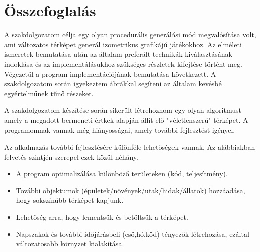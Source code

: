 \chapter*{Összefoglalás}

A szakdolgozatom célja egy olyan procedurális generálási mód megvalósítása volt, ami változatos térképet generál izometrikus grafikájú játékokhoz. Az elméleti ismeretek bemutatása után az általam preferált technikák kiválasztásának indoklása és az implementálásukhoz szükséges részletek kifejtése történt meg. Végezetül a program implementációjának bemutatása következett. A szakdolgozatom során igyekeztem ábrákkal segíteni az általam kevésbé egyértelműnek tűnő részeket. 

\bigskip

\noindent A szakdolgozatom készítése során sikerült létrehoznom egy olyan algoritmust amely a megadott bermeneti értkek alapján állít elő "véletlenszerű" térképet. A programomnak vannak még hiányosságai, amely további fejlesztést igényel.

\bigskip

\noindent Az alkalmazás további fejlesztésére különféle lehetőségek vannak. Az alábbiakban felvetés szintjén szerepel ezek közül néhány.
\begin{itemize}
\item A program optimalizálása különböző területeken (kód, teljesítmény).
\item További objektumok (épületek/növények/utak/hidak/állatok) hozzáadása, hogy sokszínűbb térképet kapjunk.
\item Lehetőség arra, hogy lementsük és betöltsük a térképet.
\item Napszakok és további időjárásbeli (eső,hó,köd) tényezők létrehozása, ezáltal változatosabb környzet kialakítása. 
\end{itemize}
